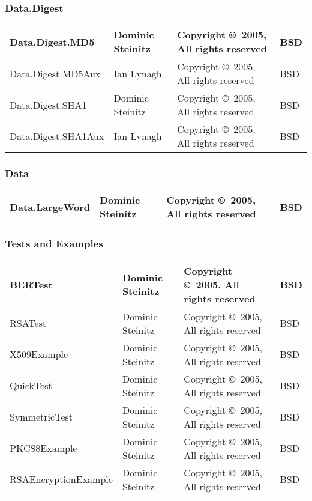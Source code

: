 \documentclass{article}
\begin{document}
\subsubsection{Data.Digest}
\begin{tabular}{|p{6cm}|p{3cm}|p{3cm}|p{1cm}|}
\hline\hline
Data.Digest.MD5 & Dominic Steinitz &
Copyright \copyright\ 2005, All rights reserved & BSD \\
\hline
Data.Digest.MD5Aux & Ian Lynagh &
Copyright \copyright\ 2005, All rights reserved & BSD \\
\hline
Data.Digest.SHA1 & Dominic Steinitz &
Copyright \copyright\ 2005, All rights reserved & BSD \\
\hline
Data.Digest.SHA1Aux & Ian Lynagh &
Copyright \copyright\ 2005, All rights reserved & BSD \\
\hline\hline
\end{tabular}

\subsubsection{Data}
\begin{tabular}{|p{6cm}|p{3cm}|p{3cm}|p{1cm}|}
\hline\hline
Data.LargeWord 
& Dominic Steinitz &
Copyright \copyright\ 2005, All rights reserved & BSD \\
\hline\hline
\end{tabular}

\subsubsection{Tests and Examples}
\begin{tabular}{|p{6cm}|p{3cm}|p{3cm}|p{1cm}|}
\hline\hline
BERTest
& Dominic Steinitz &
Copyright \copyright\ 2005, All rights reserved & BSD \\
\hline
RSATest
& Dominic Steinitz &
Copyright \copyright\ 2005, All rights reserved & BSD \\
\hline
X509Example
& Dominic Steinitz &
Copyright \copyright\ 2005, All rights reserved & BSD \\
\hline
QuickTest
& Dominic Steinitz &
Copyright \copyright\ 2005, All rights reserved & BSD \\
\hline
SymmetricTest
& Dominic Steinitz &
Copyright \copyright\ 2005, All rights reserved & BSD \\
\hline
PKCS8Example
& Dominic Steinitz &
Copyright \copyright\ 2005, All rights reserved & BSD \\
\hline
RSAEncryptionExample
& Dominic Steinitz &
Copyright \copyright\ 2005, All rights reserved & BSD \\
\hline\hline
\end{tabular}
\end{document}
